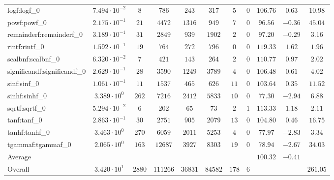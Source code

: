 \begin{tabular}{|l|c|c|c|c|c|c|c|c|c|c|}
logf:logf\_0                 & $ 7.494 \cdot 10^{-2} $ & $ 8      $ & $ 786    $ & $ 243   $ & $ 317   $ & $ 5   $ & $ 0 $ & $ 106.76      $ & $ 0.63    $ & $ 10.98   $ \\
powf:powf\_0                 & $ 2.175 \cdot 10^{-1} $ & $ 21     $ & $ 4472   $ & $ 1316  $ & $ 949   $ & $ 7   $ & $ 0 $ & $ 96.56       $ & $ -0.36   $ & $ 45.04   $ \\
remainderf:remainderf\_0     & $ 3.189 \cdot 10^{-1} $ & $ 31     $ & $ 2849   $ & $ 939   $ & $ 1902  $ & $ 2   $ & $ 0 $ & $ 97.20       $ & $ -0.29   $ & $ 3.16    $ \\
rintf:rintf\_0               & $ 1.592 \cdot 10^{-1} $ & $ 19     $ & $ 764    $ & $ 272   $ & $ 796   $ & $ 0   $ & $ 0 $ & $ 119.33      $ & $ 1.62    $ & $ 1.96    $ \\
scalbnf:scalbnf\_0           & $ 6.320 \cdot 10^{-2} $ & $ 7      $ & $ 421    $ & $ 143   $ & $ 264   $ & $ 2   $ & $ 0 $ & $ 110.77      $ & $ 0.97    $ & $ 2.02    $ \\
significandf:significandf\_0 & $ 2.629 \cdot 10^{-1} $ & $ 28     $ & $ 3590   $ & $ 1249  $ & $ 3789  $ & $ 4   $ & $ 0 $ & $ 106.48      $ & $ 0.61    $ & $ 4.02    $ \\
sinf:sinf\_0                 & $ 1.061 \cdot 10^{-1} $ & $ 11     $ & $ 1537   $ & $ 465   $ & $ 626   $ & $ 11  $ & $ 0 $ & $ 103.64      $ & $ 0.35    $ & $ 11.52   $ \\
sinhf:sinhf\_0               & $ 3.389 \cdot 10^{0}  $ & $ 262    $ & $ 7216   $ & $ 2412  $ & $ 5833  $ & $ 10  $ & $ 0 $ & $ 77.30       $ & $ -2.94   $ & $ 6.88    $ \\
sqrtf:sqrtf\_0               & $ 5.294 \cdot 10^{-2} $ & $ 6      $ & $ 202    $ & $ 65    $ & $ 73    $ & $ 2   $ & $ 1 $ & $ 113.33      $ & $ 1.18    $ & $ 2.11    $ \\
tanf:tanf\_0                 & $ 2.863 \cdot 10^{-1} $ & $ 30     $ & $ 2751   $ & $ 905   $ & $ 2079  $ & $ 13  $ & $ 0 $ & $ 104.80      $ & $ 0.46    $ & $ 16.75   $ \\
tanhf:tanhf\_0               & $ 3.463 \cdot 10^{0}  $ & $ 270    $ & $ 6059   $ & $ 2011  $ & $ 5253  $ & $ 4   $ & $ 0 $ & $ 77.97       $ & $ -2.83   $ & $ 3.34    $ \\
tgammaf:tgammaf\_0           & $ 2.065 \cdot 10^{0}  $ & $ 163    $ & $ 12687  $ & $ 3927  $ & $ 8303  $ & $ 19  $ & $ 0 $ & $ 78.94       $ & $ -2.67   $ & $ 34.03   $ \\
\hline
Average                      & $                     $ & $        $ & $        $ & $       $ & $       $ & $     $ & $   $ & $ 100.32      $ & $ -0.41   $ & $         $ \\
\hline
Overall                      & $ 3.420 \cdot 10^{1}  $ & $ 2880   $ & $ 111266 $ & $ 36831 $ & $ 84582 $ & $ 178 $ & $ 6 $ & $             $ & $         $ & $ 261.05  $ \\
\hline
\end{tabular}
